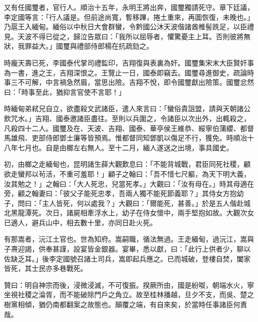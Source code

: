 \begin{pinyinscope}
又有任國璽者，官行人。順治十五年，永明王將出奔，國璽獨請死守。章下廷議，李定國等言：「行人議是。但前途尚寬，暫移蹕，捲土重來，再圖恢復，未晚也。」乃扈王入緬甸。緬俗以中秋日大會群蠻，令黔國公沐天波偕諸酋椎髻跣足，以臣禮見。天波不得已從之，歸泣告眾曰：「我所以屈辱者，懼驚憂主上耳。否則彼將無狀，我罪益大。」國璽與禮部侍郎楊在抗疏劾之。

時龐天壽已死，李國泰代掌司禮監印，吉翔復與表裏為奸。國璽集宋末大臣賢奸事為一書，進之王，吉翔深恨之。王覽止一日，國泰即竊去。國璽尋進御史，疏論時事三不可解，中言禍急然眉，當思出險。吉翔不悅，即令國璽獻出險策。國璽忿然曰：「時事至此，猶抑言官使不言耶！」

時緬甸弟弒兄自立，欲盡殺文武諸臣，遣人來言曰：「蠻俗貴詛盟，請與天朝諸公飲咒水。」吉翔、國泰邀諸臣盡往。至則以兵圍之，令諸臣以次出外，出輒殺之，凡殺四十二人。國璽及在、天波、吉翔、國泰、華亭侯王維恭、綏寧伯蒲纓、都督馬雄飛、吏部侍郎鄧士廉等皆預焉。惟都督同知鄧凱以傷足不行，獲免。時順冶十八年七月也。自是由榔左右無人。至十二月，緬人遂送之出境，事具國史。

初，由榔之走緬甸也，昆明諸生薛大觀歎息曰：「不能背城戰，君臣同死社稷，顧欲走蠻邦以茍活，不重可羞耶！」顧子之翰曰：「吾不惜七尺軀，為天下明大義，汝其勉之！」之翰曰：「大人死忠，兒當死孝。」大觀曰：「汝有母在。」時其母適在旁，顧之翰妻曰：「彼父子能死忠孝，吾兩人獨不能死節義耶？」其侍女方抱幼子，問曰：「主人皆死，何以處我？」大觀曰：「爾能死，甚善。」於是五人偕赴城北黑龍潭死。次日，諸屍相牽浮水上，幼子在侍女懷中，兩手堅抱如故。大觀次女已適人，避兵山中，相去數十里，亦同日赴火死。

有那嵩者，沅江土官也。世為知府。嵩嗣職，循法無過。王走緬甸，過沅江，嵩與子燾迎謁，供奉甚謹，設宴皆金銀器。宴畢，悉以獻，曰：「此行上供者少，聊以佐缺乏耳。」後李定國號召諸土司兵，嵩即起兵應之。已而城破，登樓自焚，闔家皆死，其士民亦多巷戰死。

贊曰：明自神宗而後，浸微浸滅，不可復振。揆厥所由，國是紛呶，朝端水火，寧坐視社稷之淪胥，而不能破除門戶之角立。故至桂林播越，旦夕不支，而吳、楚之樹黨相傾，猶仍南都翻案之故態也。顛覆之端，有自來矣，於當時任事諸臣何責哉。


\end{pinyinscope}
